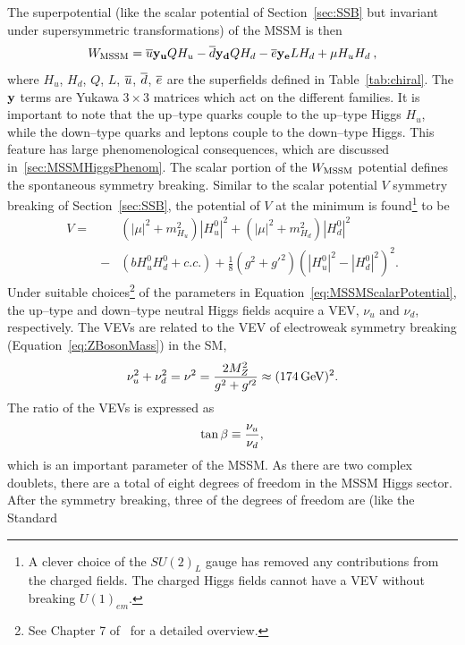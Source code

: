 The superpotential (like the scalar potential of Section~\ref{sec:SSB} but
invariant under supersymmetric transformations) of the MSSM is
then~\cite{Martin:1997um}
\begin{equation}
  W_{\rm MSSM} =
  \overline u {\bf y_u} Q H_u -
  \overline d {\bf y_d} Q H_d -
  \overline e {\bf y_e} L H_d +
  \mu H_u H_d \>,
\end{equation}
where $H_u$, $H_d$, $Q$, $L$, $\overline u$, $\overline d$, $\overline e$ are the
superfields defined in Table~\ref{tab:chiral}.  The ${\bf y}$ terms are Yukawa
$3 \times 3$ matrices which act on the different families.  It is important to
note that the up--type quarks couple to the up--type Higgs $H_u$, while the
down--type quarks and leptons couple to the down--type Higgs.  This feature has
large phenomenological consequences, which are discussed
in~\ref{sec:MSSMHiggsPhenom}.  The scalar portion of the $W_{\rm MSSM}$
potential defines the spontaneous symmetry breaking.  Similar to the scalar
potential $V$ symmetry breaking of Section~\ref{sec:SSB}, the potential of $V$
at the minimum is found\footnote{A clever choice of the $SU(2)_L$ gauge has
removed any contributions from the charged fields.  The charged Higgs fields
cannot have a VEV without breaking $U(1)_{em}$.} to be 
\begin{eqnarray}
  V =& &(|\mu|^2 + m^2_{H_u})|H^0_u|^2 + (|\mu|^2 + m^2_{H_d})|H^0_d|^2
  \nonumber \\ 
   &- &(b H^0_u H^0_d + c.c.) + \frac{1}{8}(g^2 + g'^2)(|H^0_u|^2 - |H^0_d|^2)^2.
  \label{eq:MSSMScalarPotential}
\end{eqnarray}
Under suitable choices\footnote{See Chapter 7 of~\cite{Martin:1997um} for a
detailed overview.} of the parameters in Equation~\ref{eq:MSSMScalarPotential},
the up--type and down--type neutral Higgs fields acquire a VEV, $\nu_u$ and
$\nu_d$, respectively.  The VEVs are related to the VEV of electroweak
symmetry breaking (Equation~\ref{eq:ZBosonMass}) in the SM,
\begin{equation}
  \nu_u^2 + \nu_d^2 = \nu^2 = \frac{2 M_Z^2}{g^2 + g'^2} \approx (174 \,\text{Ge\hspace{-.08em}V})^2.
  \nonumber
\end{equation}
The ratio of the VEVs is expressed as
\begin{equation}
  \tan\beta \equiv \frac{\nu_u}{\nu_d},
  \nonumber
\end{equation}
which is an important parameter of the MSSM\@.  As there are two complex doublets,
there are a total of eight degrees of freedom in the MSSM Higgs sector.  After
the symmetry breaking, three of the degrees of freedom are (like the Standard
